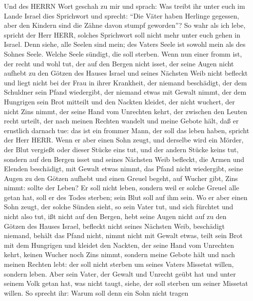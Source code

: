  Und des HERRN Wort geschah zu mir und sprach: 
Was treibt ihr unter euch im Lande Israel dies Sprichwort und sprecht:
``Die Väter haben Herlinge gegessen, aber den Kindern sind die Zähne
davon stumpf geworden''?  So wahr als ich lebe, spricht der
Herr HERR, solches Sprichwort soll nicht mehr unter euch gehen in
Israel.  Denn siehe, alle Seelen sind mein; des Vaters Seele
ist sowohl mein als des Sohnes Seele. Welche Seele sündigt, die soll
sterben.  Wenn nun einer fromm ist, der recht und wohl tut,
 der auf den Bergen nicht isset, der seine Augen nicht
aufhebt zu den Götzen des Hauses Israel und seines Nächsten Weib nicht
befleckt und liegt nicht bei der Frau in ihrer Krankheit, 
der niemand beschädigt, der dem Schuldner sein Pfand wiedergibt, der
niemand etwas mit Gewalt nimmt, der dem Hungrigen sein Brot mitteilt und
den Nackten kleidet,  der nicht wuchert, der nicht Zins
nimmt, der seine Hand vom Unrechten kehrt, der zwischen den Leuten recht
urteilt,  der nach meinen Rechten wandelt und meine Gebote
hält, daß er ernstlich darnach tue: das ist ein frommer Mann, der soll
das leben haben, spricht der Herr HERR.  Wenn er aber einen
Sohn zeugt, und derselbe wird ein Mörder, der Blut vergießt oder dieser
Stücke eins tut,  und der andern Stücke keins tut, sondern
auf den Bergen isset und seines Nächsten Weib befleckt, 
die Armen und Elenden beschädigt, mit Gewalt etwas nimmt, das Pfand
nicht wiedergibt, seine Augen zu den Götzen aufhebt und einen Greuel
begeht,  auf Wucher gibt, Zins nimmt: sollte der Leben? Er
soll nicht leben, sondern weil er solche Greuel alle getan hat, soll er
des Todes sterben; sein Blut soll auf ihm sein.  Wo er aber
einen Sohn zeugt, der solche Sünden sieht, so sein Vater tut, und sich
fürchtet und nicht also tut,  ißt nicht auf den Bergen,
hebt seine Augen nicht auf zu den Götzen des Hauses Israel, befleckt
nicht seines Nächsten Weib,  beschädigt niemand, behält das
Pfand nicht, nimmt nicht mit Gewalt etwas, teilt sein Brot mit dem
Hungrigen und kleidet den Nackten,  der seine Hand vom
Unrechten kehrt, keinen Wucher noch Zins nimmt, sondern meine Gebote
hält und nach meinen Rechten lebt: der soll nicht sterben um seines
Vaters Missetat willen, sondern leben.  Aber sein Vater,
der Gewalt und Unrecht geübt hat und unter seinem Volk getan hat, was
nicht taugt, siehe, der soll sterben um seiner Missetat willen.
 So sprecht ihr: Warum soll denn ein Sohn nicht tragen
